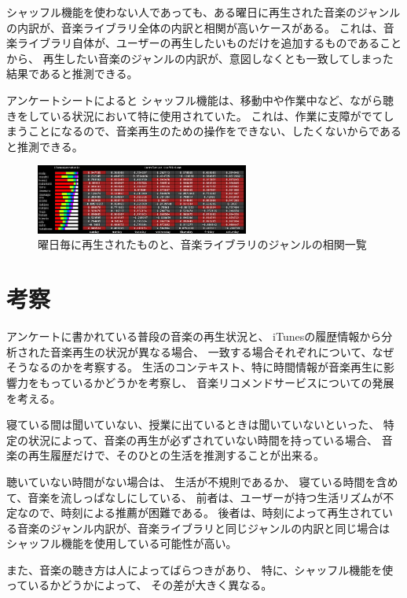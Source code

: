 \documentclass[11pt, twocolumn]{jsarticle}
\begin{document}
シャッフル機能を使わない人であっても、ある曜日に再生された音楽のジャンルの内訳が、音楽ライブラリ全体の内訳と相関が高いケースがある。
これは、音楽ライブラリ自体が、ユーザーの再生したいものだけを追加するものであることから、
再生したい音楽のジャンルの内訳が、意図しなくとも一致してしまった結果であると推測できる。


アンケートシートによると
シャッフル機能は、移動中や作業中など、ながら聴きをしている状況において特に使用されていた。
これは、作業に支障がでてしまうことになるので、音楽再生のための操作をできない、したくないからであると推測できる。


\begin{figure}
\begin{center}
\includegraphics[width = 7cm]{corTable.jpg}
\caption{曜日毎に再生されたものと、音楽ライブラリのジャンルの相関一覧}
\label{corTable}
\end{center}
\end{figure}


\section{考察}


アンケートに書かれている普段の音楽の再生状況と、
iTunesの履歴情報から分析された音楽再生の状況が異なる場合、
一致する場合それぞれについて、なぜそうなるのかを考察する。
生活のコンテキスト、特に時間情報が音楽再生に影響力をもっているかどうかを考察し、
音楽リコメンドサービスについての発展を考える。


寝ている間は聞いていない、授業に出ているときは聞いていないといった、
特定の状況によって、音楽の再生が必ずされていない時間を持っている場合、
音楽の再生履歴だけで、そのひとの生活を推測することが出来る。

聴いていない時間がない場合は、
生活が不規則であるか、
寝ている時間を含めて、音楽を流しっぱなしにしている、
前者は、ユーザーが持つ生活リズムが不定なので、時刻による推薦が困難である。
後者は、時刻によって再生されている音楽のジャンル内訳が、音楽ライブラリと同じジャンルの内訳と同じ場合は
シャッフル機能を使用している可能性が高い。


また、音楽の聴き方は人によってばらつきがあり、
特に、シャッフル機能を使っているかどうかによって、
その差が大きく異なる。
\end{document}
